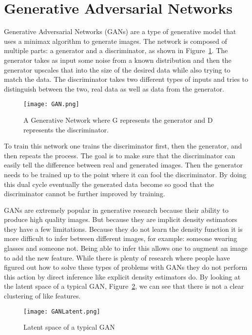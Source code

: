 \section{Generative Adversarial Networks}\label{sec:GAN}
Generative Adversarial Networks (GANs) are a type of generative model
that uses a minimax algorithm to generate images. The network is composed of
multiple parts: a generator and a discriminator, as shown in
Figure~\ref{fig:gan}. The generator takes as input some noise from a known
distribution and then the generator upscales that into the size of the desired
data while also trying to match the data. The discriminator takes two different
types of inputs and tries to distinguish between the two, real data as well as
data from the generator.

\begin{figure}[ht]
    \centering
    \texttt{[image: GAN.png]}
    \caption{A Generative Network where G represents the generator and D represents
        the discriminator.}
    \label{fig:gan}
\end{figure}

To train this network one trains the discriminator first, then the generator,
and then repeats the process. The goal is to make sure that the discriminator
can easily tell the difference between real and generated images. Then the
generator needs to be trained up to the point where it can fool the
discriminator. By doing this dual cycle eventually the generated data become so
good that the discriminator cannot be further improved by training. 

GANs are extremely popular in generative research because their ability to
produce high quality images. But because they are implicit density estimators
they have a few limitations. Because they do not learn the density function it
is more difficult to infer between different images, for example: someone
wearing glasses and someone not. Being able to infer this allows one to augment
an image to add the new feature. While there is plenty of research where people
have figured out how to solve these types of problems with GANs they do
not perform this action by direct inference like explicit density estimators do.
By looking at the latent space of a typical GAN, Figure~\ref{fig:ganLS}, we can
see that there is not a clear clustering of like features.

\begin{figure}[ht]
\centering
\texttt{[image: GANLatent.png]}
\caption{Latent space of a typical GAN}
\label{fig:ganLS}
\end{figure}

